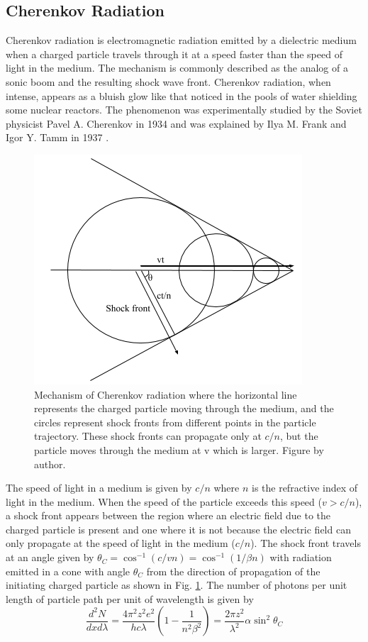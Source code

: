 \documentclass[main.tex]{subfiles}
\begin{document}
\subsection{Cherenkov Radiation}
Cherenkov radiation is electromagnetic radiation emitted by a dielectric medium when a charged particle travels through it at a speed faster than the speed of light in the medium. The mechanism is commonly described as the analog of a sonic boom and the resulting shock wave front. Cherenkov radiation, when intense, appears as a bluish glow like that noticed in the pools of water shielding some nuclear reactors. The phenomenon was experimentally studied by the Soviet physicist Pavel A. Cherenkov in 1934 \cite{Cherenkova:2008zz} and was explained by Ilya M. Frank and Igor Y. Tamm in 1937 \cite{Frank:1937fk}.\par

\begin{figure}[htbp]
  \centering
  \includegraphics[width=0.6\linewidth]{images/Cherenkov}
  \caption[Mechanism of Cherenkov radiation.]{Mechanism of Cherenkov radiation where the horizontal line represents the charged particle moving through the medium, and the circles represent shock fronts from different points in the particle trajectory. These shock fronts can propagate only at $c/n$, but the particle moves through the medium at v which is larger. Figure by author.}
  \label{fig:Cherenkov}
\end{figure}

The speed of light in a medium is given by $c/n$ where $n$ is the refractive index of light in the medium. When the speed of the particle exceeds this speed ($v>c/n$), a shock front appears between the region where an electric field due to the charged particle is present and one where it is not because the electric field can only propagate at the speed of light in the medium ($c/n$). The shock front travels at an angle given by $\theta_C = \cos^{-1}(c/vn) = \cos^{-1}(1/\beta n)$ with radiation emitted in a cone with angle $\theta_C$ from the direction of propagation of the initiating charged particle as shown in Fig. \ref{fig:Cherenkov}. The number of photons per unit length of particle path per unit of wavelength is given by 
\begin{equation}
  \frac{d^2N}{dxd\lambda} = \frac{4\pi^2z^2e^2}{hc\lambda}\left(1-\frac{1}{n^2\beta^2}\right) = \frac{2\pi z^2}{\lambda^2}\alpha\sin^2\theta_C
\end{equation}
\end{document}
